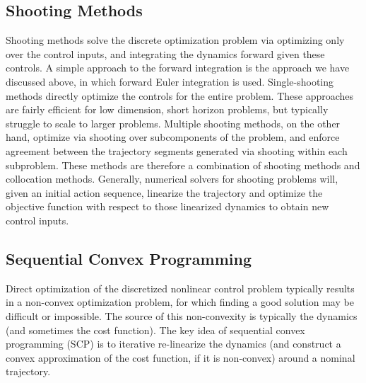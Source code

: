 \subsection{Shooting Methods}

Shooting methods solve the discrete optimization problem via optimizing only over the control inputs, and integrating the dynamics forward given these controls. A simple approach to the forward integration is the approach we have discussed above, in which forward Euler integration is used. Single-shooting methods directly optimize the controls for the entire problem. These approaches are fairly efficient for low dimension, short horizon problems, but typically struggle to scale to larger problems. Multiple shooting methods, on the other hand, optimize via shooting over subcomponents of the problem, and enforce agreement between the trajectory segments generated via shooting within each subproblem. These methods are therefore a combination of shooting methods and collocation methods. Generally, numerical solvers for shooting problems will, given an initial action sequence, linearize the trajectory and optimize the objective function with respect to those linearized dynamics to obtain new control inputs.



\subsection{Sequential Convex Programming}

Direct optimization of the discretized nonlinear control problem typically results in a non-convex optimization problem, for which finding a good solution may be difficult or impossible. The source of this non-convexity is typically the dynamics (and sometimes the cost function). The key idea of sequential convex programming (SCP) is to iterative re-linearize the dynamics (and construct a convex approximation of the cost function, if it is non-convex) around a nominal trajectory. 

